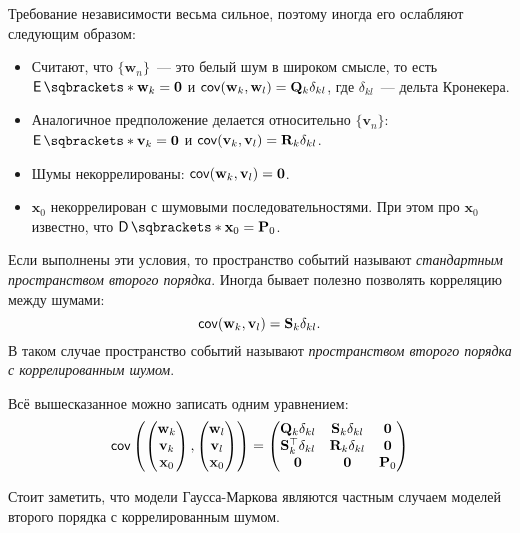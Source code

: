 Требование независимости весьма сильное, поэтому иногда его ослабляют следующим 
образом:
\begin{itemize}
	\item Считают, что \(\{\mathbf{w}_{n}\}\)~--- это белый шум в широком 
	смысле, то есть \(\E{\mathbf{w}_{k}} = \mathbf{0}\) и 
	\(\operatorname{\mathsf{cov}}(\mathbf{w}_{k}, \mathbf{w}_{l}) = \mathbf{Q}_{k}\delta_{kl}\), где 
	\(\delta_{kl}\)~--- дельта Кронекера.
	\item Аналогичное предположение делается относительно 
	\(\{\mathbf{v}_{n}\}\): \(\E{\mathbf{v}_{k}} = \mathbf{0}\) и 
	\(\operatorname{\mathsf{cov}}(\mathbf{v}_{k}, \mathbf{v}_{l}) = \mathbf{R}_{k}\delta_{kl}\).
	\item Шумы некоррелированы: \(\operatorname{\mathsf{cov}}(\mathbf{w}_{k}, \mathbf{v}_{l}) = 
	\mathbf{0}\).
	\item \(\mathbf{x}_{0}\) некоррелирован с шумовыми последовательностями. 
	При этом про \(\mathbf{x}_{0}\) известно, что \(\D{\mathbf{x}_{0}} = 
	\mathbf{P}_{0}\).
\end{itemize}

Если выполнены эти условия, то пространство событий называют 
\emph{стандартным пространством второго порядка}. Иногда бывает полезно 
позволять корреляцию между шумами:
\[
	\operatorname{\mathsf{cov}}(\mathbf{w}_{k}, \mathbf{v}_{l}) = \mathbf{S}_{k}\delta_{kl}.
\] 
В таком случае пространство событий называют \emph{пространством второго 
порядка с коррелированным шумом}. 

Всё вышесказанное можно записать одним уравнением:
\[
	\operatorname{\mathsf{cov}}\left(
	\begin{pmatrix}
	\mathbf{w}_{k} \\ \mathbf{v}_{k} \\ \mathbf{x}_{0}
	\end{pmatrix}
	,
	\begin{pmatrix}
	\mathbf{w}_{l} \\ \mathbf{v}_{l} \\ \mathbf{x}_{0}
	\end{pmatrix}
	\right)
	=
	\begin{pmatrix}
	\mathbf{Q}_{k}\delta_{kl} & \mathbf{S}_{k}\delta_{kl} & \mathbf{0} \\
	\mathbf{S}_{k}^{\top}\delta_{kl} & \mathbf{R}_{k}\delta_{kl} & 
	\mathbf{0} \\
	\mathbf{0} & \mathbf{0} & \mathbf{P}_{0}
	\end{pmatrix}
\]

Стоит заметить, что модели Гаусса-Маркова являются частным случаем моделей 
второго порядка с коррелированным шумом.

